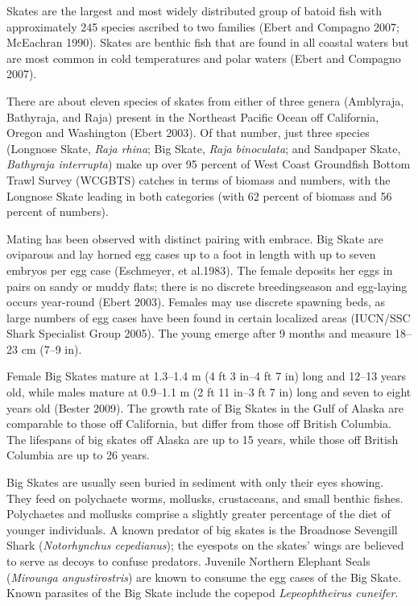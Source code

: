\documentclass[12pt,]{article}
\begin{document}
Skates are the largest and most widely distributed group of batoid fish
with approximately 245 species ascribed to two families (Ebert and
Compagno 2007; McEachran 1990). Skates are benthic fish that are found
in all coastal waters but are most common in cold temperatures and polar
waters (Ebert and Compagno 2007).

There are about eleven species of skates from either of three genera
(Amblyraja, Bathyraja, and Raja) present in the Northeast Pacific Ocean
off California, Oregon and Washington (Ebert 2003). Of that number, just
three species (Longnose Skate, \emph{Raja rhina}; Big Skate, \emph{Raja
binoculata}; and Sandpaper Skate, \emph{Bathyraja interrupta}) make up
over 95 percent of West Coast Groundfish Bottom Trawl Survey (WCGBTS)
catches in terms of biomass and numbers, with the Longnose Skate leading
in both categories (with 62 percent of biomass and 56 percent of
numbers).

Mating has been observed with distinct pairing with embrace. Big Skate
are oviparous and lay horned egg cases up to a foot in length with up to
seven embryos per egg case (Eschmeyer, et al.1983). The female deposits
her eggs in pairs on sandy or muddy flats; there is no discrete
breedingseason and egg-laying occurs year-round (Ebert 2003). Females
may use discrete spawning beds, as large numbers of egg cases have been
found in certain localized areas (IUCN/SSC Shark Specialist Group 2005).
The young emerge after 9 months and measure 18--23 cm (7--9 in).

Female Big Skates mature at 1.3--1.4 m (4 ft 3 in--4 ft 7 in) long and
12--13 years old, while males mature at 0.9--1.1 m (2 ft 11 in--3 ft 7
in) long and seven to eight years old (Bester 2009). The growth rate of
Big Skates in the Gulf of Alaska are comparable to those off California,
but differ from those off British Columbia. The lifespans of big skates
off Alaska are up to 15 years, while those off British Columbia are up
to 26 years.

Big Skates are usually seen buried in sediment with only their eyes
showing. They feed on polychaete worms, mollusks, crustaceans, and small
benthic fishes. Polychaetes and mollusks comprise a slightly greater
percentage of the diet of younger individuals. A known predator of big
skates is the Broadnose Sevengill Shark (\emph{Notorhynchus
cepedianus}); the eyespots on the skates' wings are believed to serve as
decoys to confuse predators. Juvenile Northern Elephant Seals
(\emph{Mirounga angustirostris}) are known to consume the egg cases of
the Big Skate. Known parasites of the Big Skate include the copepod
\emph{Lepeophtheirus cuneifer}.
\end{document}
